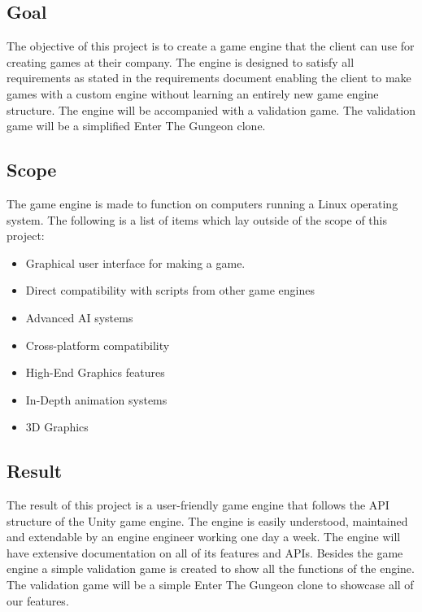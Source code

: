 \documentclass{article} %
\begin{document}
\subsection{Goal}
The objective of this project is to create a game engine that the client can use for creating games at their company.
The engine is designed to satisfy all requirements as stated in the requirements document enabling the client to make games with a custom engine without learning an entirely new game engine structure.
The engine will be accompanied with a validation game. 
The validation game will be a simplified Enter The Gungeon clone.


\subsection{Scope}
The game engine is made to function on computers running a Linux operating system.
\newline\newline
The following is a list of items which lay outside of the scope of this project:
\begin{itemize}
    \item Graphical user interface for making a game.
    \item Direct compatibility with scripts from other game engines
    \item Advanced AI systems
    \item Cross-platform compatibility
    \item High-End Graphics features
    \item In-Depth animation systems
    \item 3D Graphics
\end{itemize}

\subsection{Result}
The result of this project is a user-friendly game engine that follows the API structure of the Unity game engine.
The engine is easily understood, maintained and extendable by an engine engineer working one day a week.
The engine will have extensive documentation on all of its features and APIs.
\newline\newline
Besides the game engine a simple validation game is created to show all the functions of the engine.
The validation game will be a simple Enter The Gungeon clone to showcase all of our features.
\newpage
\end{document}
